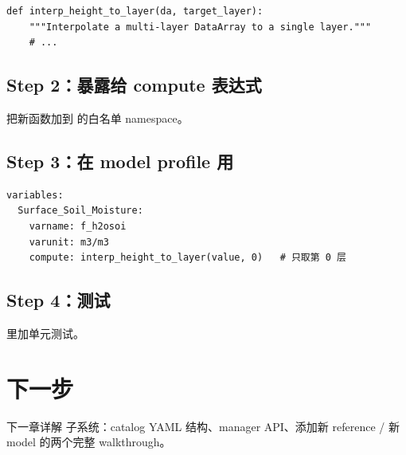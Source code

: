\begin{verbatim}
def interp_height_to_layer(da, target_layer):
    """Interpolate a multi-layer DataArray to a single layer."""
    # ...
\end{verbatim}

\subsection{Step 2：暴露给 compute 表达式}

把新函数加到  的白名单 namespace。

\subsection{Step 3：在 model profile 用}

\begin{verbatim}
variables:
  Surface_Soil_Moisture:
    varname: f_h2osoi
    varunit: m3/m3
    compute: interp_height_to_layer(value, 0)   # 只取第 0 层
\end{verbatim}

\subsection{Step 4：测试}

 里加单元测试。

\section{下一步}

下一章详解  子系统：catalog YAML 结构、manager API、添加新 reference / 新 model 的两个完整 walkthrough。
